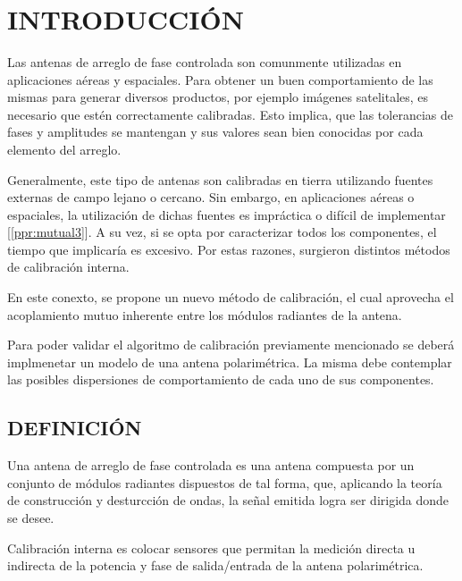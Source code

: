 \documentclass[a4paper,10pt]{article}
\title{  }
\begin{document}
	\maketitle %
	
	\tableofcontents %
	\newpage

	\section{INTRODUCCIÓN}
    
Las antenas de arreglo de fase controlada son comunmente utilizadas en 
aplicaciones aéreas y espaciales. Para obtener un buen comportamiento de las
mismas para generar diversos productos, por ejemplo imágenes satelitales, es 
necesario que estén correctamente calibradas. Esto implica, que las tolerancias
de fases y amplitudes se mantengan y sus valores sean bien conocidas por cada
elemento del arreglo.

Generalmente, este tipo de antenas son calibradas en tierra utilizando fuentes 
externas de campo lejano o cercano. Sin embargo, en aplicaciones aéreas o 
espaciales, la utilización de dichas fuentes es impráctica o difícil de 
implementar [\ref{ppr:mutual3}]. A su vez, si se opta por caracterizar todos los
componentes, el tiempo que implicaría es excesivo. Por estas razones, surgieron
distintos métodos de calibración interna.

    En este conexto, se propone un nuevo método de calibración, el cual 
aprovecha el acoplamiento mutuo inherente entre los módulos radiantes de la 
antena.

    Para poder validar el algoritmo de calibración previamente mencionado se 
deberá implmenetar un modelo de una antena polarimétrica. La misma debe 
contemplar las posibles dispersiones de comportamiento de cada uno de
sus componentes.

	\subsection{DEFINICIÓN}
		Una antena de arreglo de fase controlada es una antena compuesta por un
	conjunto de módulos radiantes dispuestos de tal forma, que, aplicando la
	teoría de construcción y desturcción de ondas, la señal emitida logra ser 
	dirigida donde se desee.
		
		Calibración interna es colocar sensores que permitan la medición directa
	u indirecta de la potencia y fase de salida/entrada de la antena 
	polarimétrica.
		
\end{document}
